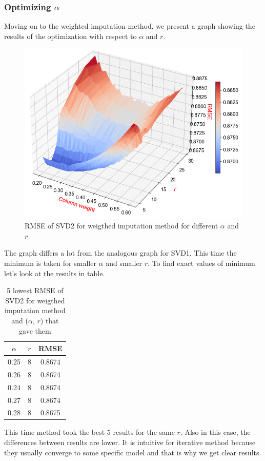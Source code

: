 \documentclass[10pt]{amsart}
\begin{document}
\subsubsection*{Optimizing $\alpha$}
Moving on to the weighted imputation method, we present a graph showing the results of the optimization with respect to $\alpha$ and $r$.
\begin{figure}[H]
\includegraphics[scale = 0.54]{svd2_r_w2}
\caption{RMSE of SVD2 for weigthed imputation method for different $\alpha$ and $r$}
\end{figure}
The graph differs a lot from the analogous graph for SVD1.
This time the minimum is taken for smaller $\alpha$ and smaller $r$.
To find exact values of minimum let's look at the results in table.

\begin{table}[H]
\begin{tabular}{cc|c}
$\alpha$ &  $r$ &     RMSE \\
\hline
       0.25 &  8 & 0.8674 \\
       0.26 &  8 & 0.8674 \\
       0.24 &  8 & 0.8674 \\
       0.27 &  8 & 0.8674 \\
       0.28 &  8 & 0.8675 \\
\end{tabular}
\caption{5 lowest RMSE of SVD2 for weigthed imputation method and ($\alpha$, $r$) that gave them}
\end{table}
This time method took the best 5 results for the same $r$.
Also in this case, the differences between results are lower.
It is intuitive for iterative method because they usually converge to some specific model and that is why we get clear results.
\end{document}
